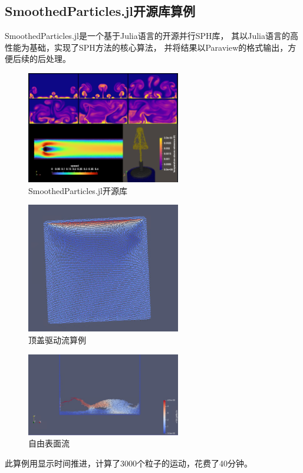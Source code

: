 \subsection{SmoothedParticles.jl开源库算例}

\begin{frame}
    SmoothedParticles.jl是一个基于Julia语言的开源并行SPH库，
    其以Julia语言的高性能为基础，实现了SPH方法的核心算法，
    并将结果以Paraview的格式输出，方便后续的后处理。
    \begin{figure}[H]
        \centering
        \includegraphics[width=0.6\textwidth]{images/smoothedparticles.png}
        \caption{SmoothedParticles.jl开源库}
    \end{figure}
\end{frame}

\begin{frame}

    \begin{figure}[H]
        \centering
        \includegraphics[width=0.6\textwidth]{images/lid_driven_cavity.png}
        \caption{顶盖驱动流算例}
    \end{figure}
\end{frame}

\begin{frame}
    \begin{figure}[H]
        \centering
        \includegraphics[width=0.6\textwidth]{images/free_surface.png}
        \caption{自由表面流}
    \end{figure}
    此算例用显示时间推进，计算了3000个粒子的运动，花费了40分钟。
\end{frame}

